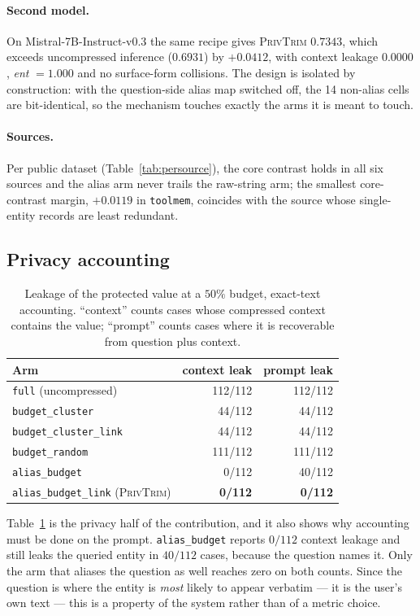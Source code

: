 \documentclass[conference]{IEEEtran}
\newcommand{\ours}{\textsc{PrivTrim}}
\newcommand{\arm}[1]{\texttt{#1}}
\newcommand{\ent}{\emph{ent}}
\begin{document}
\paragraph{Second model.}
On Mistral-7B-Instruct-v0.3 the same recipe gives \ours{} $0.7343$, which exceeds uncompressed
inference ($0.6931$) by $+0.0412$, with context leakage $0.0000$, \ent{} $=1.000$ and no
surface-form collisions. The design is isolated by construction: with the question-side alias
map switched off, the 14 non-alias cells are bit-identical, so the mechanism touches exactly
the arms it is meant to touch.

\paragraph{Sources.}
Per public dataset (Table~\ref{tab:persource}), the core contrast holds in all six sources and
the alias arm never trails the raw-string arm; the smallest core-contrast margin, $+0.0119$ in
\arm{toolmem}, coincides with the source whose single-entity records are least redundant.

\subsection{Privacy accounting}
\label{sec:res-priv}

\begin{table}[t]
\caption{Leakage of the protected value at a $50\%$ budget, exact-text accounting. ``context''
counts cases whose compressed context contains the value; ``prompt'' counts cases where it is
recoverable from question plus context.}
\label{tab:priv}
\centering
\footnotesize\setlength{\tabcolsep}{3.5pt}
\begin{tabular}{lrr}
\toprule
Arm & context leak & prompt leak \\
\midrule
\arm{full} (uncompressed) & 112/112 & 112/112 \\
\arm{budget\_cluster} & 44/112 & 44/112 \\
\arm{budget\_cluster\_link} & 44/112 & 44/112 \\
\arm{budget\_random} & 111/112 & 111/112 \\
\arm{alias\_budget} & 0/112 & 40/112 \\
\arm{alias\_budget\_link} (\ours) & \textbf{0/112} & \textbf{0/112} \\
\bottomrule
\end{tabular}
\end{table}

Table~\ref{tab:priv} is the privacy half of the contribution, and it also shows why accounting
must be done on the prompt. \arm{alias\_budget} reports $0/112$ context leakage and still leaks
the queried entity in $40/112$ cases, because the question names it. Only the arm that aliases
the question as well reaches zero on both counts. Since the question is where the entity is
\emph{most} likely to appear verbatim --- it is the user's own text --- this is a property of
the system rather than of a metric choice.
\end{document}
